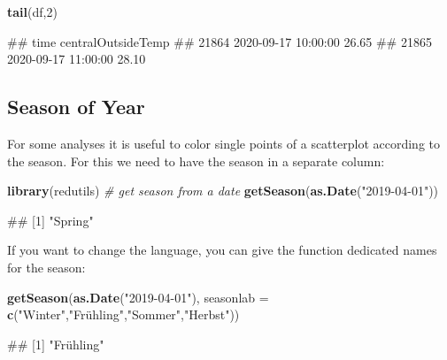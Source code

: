 \documentclass[
  a4paperpaper,
]{book}
\newenvironment{Shaded}{\begin{snugshade}}{\end{snugshade}}
\newcommand{\CommentTok}[1]{\textcolor[rgb]{0.56,0.35,0.01}{\textit{#1}}}
\newcommand{\DataTypeTok}[1]{\textcolor[rgb]{0.13,0.29,0.53}{#1}}
\newcommand{\DecValTok}[1]{\textcolor[rgb]{0.00,0.00,0.81}{#1}}
\newcommand{\KeywordTok}[1]{\textcolor[rgb]{0.13,0.29,0.53}{\textbf{#1}}}
\newcommand{\NormalTok}[1]{#1}
\newcommand{\StringTok}[1]{\textcolor[rgb]{0.31,0.60,0.02}{#1}}
\let\oldShaded\Shaded
\let\endoldShaded\endShaded
\renewenvironment{Shaded}{\footnotesize\oldShaded}{\endoldShaded}
\let\oldverbatim\verbatim
\let\endoldverbatim\endverbatim
\renewenvironment{verbatim}{\footnotesize\oldverbatim}{\endoldverbatim}
\begin{document}
\begin{Shaded}
\begin{Highlighting}[]
\KeywordTok{tail}\NormalTok{(df,}\DecValTok{2}\NormalTok{)}
\end{Highlighting}
\end{Shaded}

\begin{verbatim}
##                      time centralOutsideTemp
## 21864 2020-09-17 10:00:00              26.65
## 21865 2020-09-17 11:00:00              28.10
\end{verbatim}

\newpage

\hypertarget{season-of-year}{%
\subsection{Season of Year}\label{season-of-year}}

For some analyses it is useful to color single points of a scatterplot according to the season. For this we need to have the season in a separate column:

\begin{Shaded}
\begin{Highlighting}[]
\KeywordTok{library}\NormalTok{(redutils)}
\CommentTok{# get season from a date}
\KeywordTok{getSeason}\NormalTok{(}\KeywordTok{as.Date}\NormalTok{(}\StringTok{"2019-04-01"}\NormalTok{))}
\end{Highlighting}
\end{Shaded}

\begin{verbatim}
## [1] "Spring"
\end{verbatim}

If you want to change the language, you can give the function dedicated names for the season:

\begin{Shaded}
\begin{Highlighting}[]
\KeywordTok{getSeason}\NormalTok{(}\KeywordTok{as.Date}\NormalTok{(}\StringTok{"2019-04-01"}\NormalTok{),}
                  \DataTypeTok{seasonlab =} \KeywordTok{c}\NormalTok{(}\StringTok{"Winter"}\NormalTok{,}\StringTok{"Frühling","}\NormalTok{Sommer}\StringTok{","}\NormalTok{Herbst}\StringTok{"))}
\end{Highlighting}
\end{Shaded}

\begin{verbatim}
## [1] "Frühling"
\end{verbatim}
\end{document}
